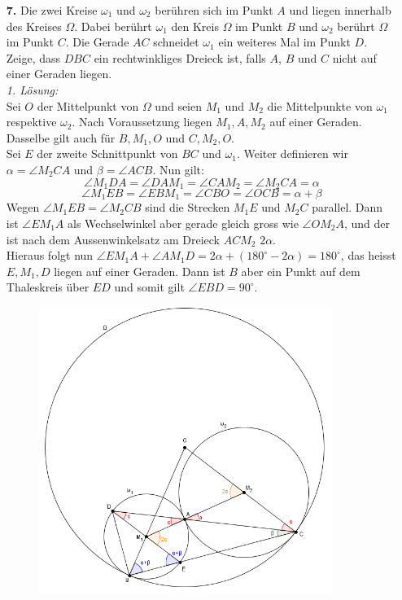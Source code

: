 \documentclass[12pt,a4paper]{article}
\theoremstyle{plain}
\theoremstyle{definition}
\theoremstyle{remark}
\begin{document}
\begin{enumerate}
    \item[\textbf{7.}]
Die zwei Kreise $\omega_1$ und $\omega_2$ berühren sich im Punkt $A$ und liegen innerhalb des Kreises $\Omega$. Dabei berührt $\omega_1$ den Kreis $\Omega$ im Punkt $B$ und $\omega_2$ berührt $\Omega$ im Punkt $C$. Die Gerade $AC$ schneidet $\omega_1$ ein weiteres Mal im Punkt $D$.\\
Zeige, dass $DBC$ ein rechtwinkliges Dreieck ist, falls $A$, $B$ und $C$ nicht auf einer Geraden liegen.\\

\textit{1. Lösung:}\\
Sei $O$ der Mittelpunkt von $\Omega$ und seien $M_1$ und $M_2$ die Mittelpunkte von $\omega_1$ respektive $\omega_2$. Nach Voraussetzung liegen $M_1,A,M_2$ auf einer Geraden. Dasselbe gilt auch für $B,M_1,O$ und $C,M_2,O$.\\
Sei $E$ der zweite Schnittpunkt von $BC$ und $\omega_1$. Weiter definieren wir $\alpha=\angle M_2CA$ und $\beta=\angle ACB$. Nun gilt:
\[\angle M_1DA=\angle DAM_1=\angle CAM_2=\angle M_2CA=\alpha\]
\[\angle M_1EB=\angle EBM_1=\angle CBO=\angle OCB=\alpha+\beta\]
Wegen $\angle M_1EB=\angle M_2CB$ sind die Strecken $M_1E$ und $M_2C$ parallel. Dann ist $\angle EM_1A$ als Wechselwinkel aber gerade gleich gross wie $\angle OM_2A$, und der ist nach dem Aussenwinkelsatz am Dreieck $ACM_2$ $2\alpha$.\\
Hieraus folgt nun $\angle EM_1A+\angle AM_1D=2\alpha+(180^\circ-2\alpha)=180^\circ$, das heisst $E,M_1,D$ liegen auf einer Geraden. Dann ist $B$ aber ein Punkt auf dem Thaleskreis über $ED$ und somit gilt $\angle EBD=90^\circ$.\\
\begin{figure}
\centering \includegraphics[trim=2cm 0cm 0cm 6cm, clip = true, width=0.90\textwidth]{Aufgabe7_1}
\end{figure}


\end{enumerate}
\end{document}
